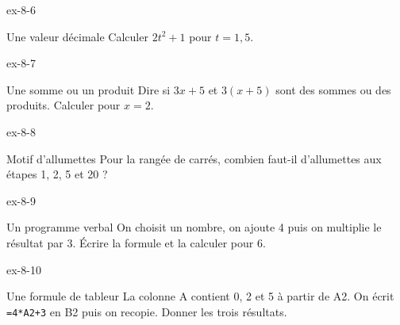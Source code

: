 \begin{blocLivre}{ex-8-6}\begin{exercice}[2]{Une valeur décimale}
Calculer $2t^2+1$ pour $t=1{,}5$.
\end{exercice}\end{blocLivre}
\begin{blocLivre}{ex-8-7}\begin{exercice}[2]{Une somme ou un produit}
Dire si $3x+5$ et $3(x+5)$ sont des sommes ou des produits. Calculer pour $x=2$.
\end{exercice}\end{blocLivre}
\begin{blocLivre}{ex-8-8}\begin{exercice}[2]{Motif d’allumettes}
Pour la rangée de carrés, combien faut-il d’allumettes aux étapes 1, 2, 5 et 20 ?
\label{fig-ex-8-8}
\end{exercice}\end{blocLivre}
\begin{blocLivre}{ex-8-9}\begin{exercice}[2]{Un programme verbal}
On choisit un nombre, on ajoute 4 puis on multiplie le résultat par 3. Écrire la formule et la calculer pour 6.
\end{exercice}\end{blocLivre}
\begin{blocLivre}{ex-8-10}\begin{exercice}[2]{Une formule de tableur}
La colonne A contient 0, 2 et 5 à partir de A2. On écrit \texttt{=4*A2+3} en B2 puis on recopie. Donner les trois résultats.
\end{exercice}\end{blocLivre}

